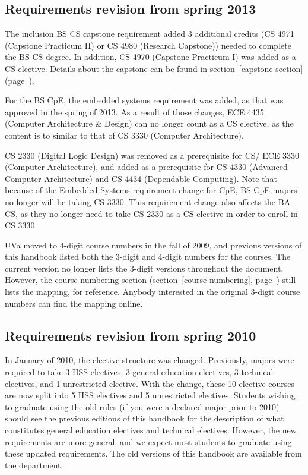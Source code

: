 \iffalse

\subsection{Requirements revision from spring 2013}

The inclusion BS CS capstone requirement added 3 additional credits
(CS 4971 (Capstone Practicum II) or CS 4980 (Research Capstone))
needed to complete the BS CS degree.  In addition, CS 4970 (Capstone
Practicum I) was added as a CS elective.  Details about the capstone
can be found in section~\ref{capstone-section}
(page~\pageref{capstone-section}).

For the BS CpE, the embedded systems requirement was added, as that
was approved in the spring of 2013.  As a result of those changes, ECE
4435 (Computer Architecture \& Design) can no longer count as a CS
elective, as the content is to similar to that of CS 3330 (Computer
Architecture).

CS 2330 (Digital Logic Design) was removed as a prerequisite for
CS/ ECE 3330 (Computer Architecture), and added as a prerequisite for
CS 4330 (Advanced Computer Architecture) and CS 4434 (Dependable
Computing).  Note that because of the Embedded Systems requirement
change for CpE, BS CpE majors no longer will be taking CS 3330.
This requirement change also affects the BA CS, as they no longer need
to take CS 2330 as a CS elective in order to enroll in CS 3330.

UVa moved to 4-digit course numbers in the fall of 2009, and previous
versions of this handbook listed both the 3-digit and 4-digit numbers
for the courses.  The current version no longer lists the 3-digit
versions throughout the document.  However, the course numbering
section (section~\ref{course-numbering},
page~\pageref{course-numbering}) still lists the mapping, for
reference.  Anybody interested in the original 3-digit course numbers
can find the mapping
online.

\subsection{Requirements revision from spring 2010}

In January of 2010, the elective structure was changed. Previously,
majors were required to take 3 HSS electives, 3 general education
electives, 3 technical electives, and 1 unrestricted elective. With
the change, these 10 elective courses are now split into 5 HSS
electives and 5 unrestricted electives. Students wishing to graduate
using the old rules (if you were a declared major prior to 2010)
should see the previous editions of this handbook for the description
of what constitutes general education electives and technical
electives. However, the new requirements are more general, and we
expect most students to graduate using these updated requirements. The
old versions of this handbook are available from the department.

